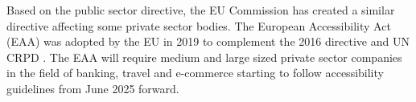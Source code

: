 Based on the public sector directive, the EU Commission has created a similar directive affecting some private sector bodies. The European Accessibility Act (EAA) was adopted by the EU in 2019 to complement the 2016 directive and UN CRPD \citep{eudirective2019}. The EAA will require medium and large sized private sector companies in the field of banking, travel and e-commerce starting to follow accessibility guidelines from June 2025 forward.

